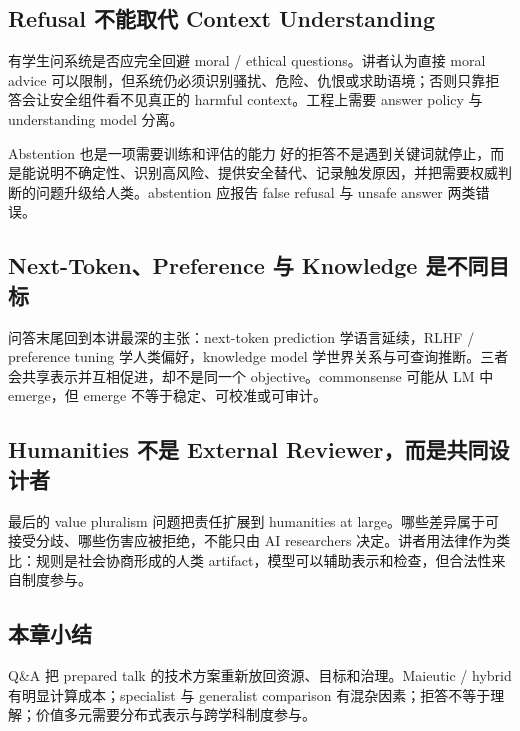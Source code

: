 \documentclass[a4paper]{article}
\begin{document}
\subsection{Refusal 不能取代 Context Understanding}

有学生问系统是否应完全回避 moral / ethical questions。讲者认为直接 moral advice 可以限制，但系统仍必须识别骚扰、危险、仇恨或求助语境；否则只靠拒答会让安全组件看不见真正的 harmful context。工程上需要 answer policy 与 understanding model 分离。

\begin{importantbox}{Abstention 也是一项需要训练和评估的能力}
好的拒答不是遇到关键词就停止，而是能说明不确定性、识别高风险、提供安全替代、记录触发原因，并把需要权威判断的问题升级给人类。abstention 应报告 false refusal 与 unsafe answer 两类错误。
\end{importantbox}

\subsection{Next-Token、Preference 与 Knowledge 是不同目标}

问答末尾回到本讲最深的主张：next-token prediction 学语言延续，RLHF / preference tuning 学人类偏好，knowledge model 学世界关系与可查询推断。三者会共享表示并互相促进，却不是同一个 objective。commonsense 可能从 LM 中 emerge，但 emerge 不等于稳定、可校准或可审计。


\subsection{Humanities 不是 External Reviewer，而是共同设计者}

最后的 value pluralism 问题把责任扩展到 humanities at large。哪些差异属于可接受分歧、哪些伤害应被拒绝，不能只由 AI researchers 决定。讲者用法律作为类比：规则是社会协商形成的人类 artifact，模型可以辅助表示和检查，但合法性来自制度参与。

\subsection{本章小结}

Q\&A 把 prepared talk 的技术方案重新放回资源、目标和治理。Maieutic / hybrid 有明显计算成本；specialist 与 generalist comparison 有混杂因素；拒答不等于理解；价值多元需要分布式表示与跨学科制度参与。
\end{document}
